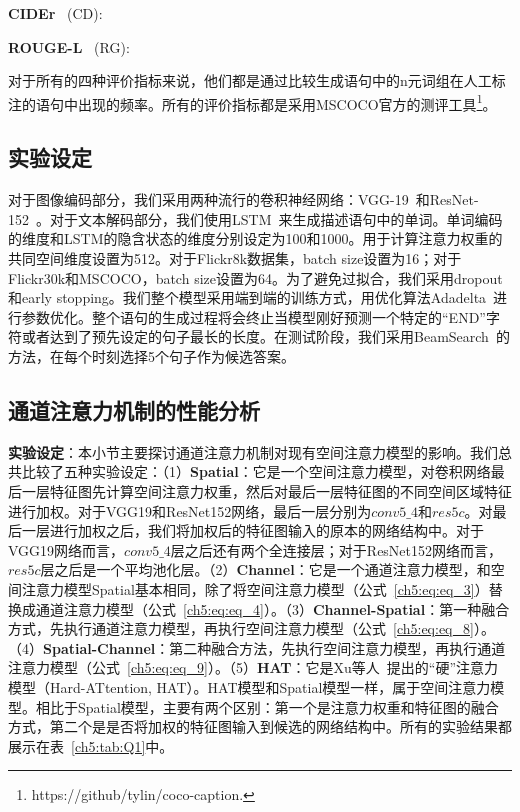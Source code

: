 \noindent\textbf{CIDEr}~\cite{vedantam2015cider} (CD):

\noindent\textbf{ROUGE-L}~\cite{lin2002manual} (RG):


对于所有的四种评价指标来说，他们都是通过比较生成语句中的n元词组在人工标注的语句中出现的频率。所有的评价指标都是采用MSCOCO官方的测评工具\footnote{https://github/tylin/coco-caption.}。



\subsection{实验设定}
对于图像编码部分，我们采用两种流行的卷积神经网络：VGG-19~\cite{simonyan2015very}和ResNet-152~\cite{he2016deep}。对于文本解码部分，我们使用LSTM~\cite{hochreiter1997long}来生成描述语句中的单词。单词编码的维度和LSTM的隐含状态的维度分别设定为100和1000。用于计算注意力权重的共同空间维度设置为512。对于Flickr8k数据集，batch size设置为16；对于Flickr30k和MSCOCO，batch size设置为64。为了避免过拟合，我们采用dropout和early stopping。我们整个模型采用端到端的训练方式，用优化算法Adadelta~\cite{zeiler2012adadelta}进行参数优化。整个语句的生成过程将会终止当模型刚好预测一个特定的“END”字符或者达到了预先设定的句子最长的长度。在测试阶段，我们采用BeamSearch~\cite{vinyals2015show}的方法，在每个时刻选择5个句子作为候选答案。


\subsection{通道注意力机制的性能分析}

\textbf{实验设定}：本小节主要探讨通道注意力机制对现有空间注意力模型的影响。我们总共比较了五种实验设定：（1）\textbf{Spatial}：它是一个空间注意力模型，对卷积网络最后一层特征图先计算空间注意力权重，然后对最后一层特征图的不同空间区域特征进行加权。对于VGG19和ResNet152网络，最后一层分别为$conv5\_4$和$res5c$。对最后一层进行加权之后，我们将加权后的特征图输入的原本的网络结构中。对于VGG19网络而言，$conv5\_4$层之后还有两个全连接层；对于ResNet152网络而言，$res5c$层之后是一个平均池化层。（2）\textbf{Channel}：它是一个通道注意力模型，和空间注意力模型Spatial基本相同，除了将空间注意力模型（公式~\eqref{ch5:eq:eq_3}）替换成通道注意力模型（公式~\eqref{ch5:eq:eq_4}）。（3）\textbf{Channel-Spatial}：第一种融合方式，先执行通道注意力模型，再执行空间注意力模型（公式~\eqref{ch5:eq:eq_8}）。（4）\textbf{Spatial-Channel}：第二种融合方法，先执行空间注意力模型，再执行通道注意力模型（公式~\eqref{ch5:eq:eq_9}）。（5）\textbf{HAT}：它是Xu等人~\cite{xu2015show}提出的“硬”注意力模型（Hard-ATtention, HAT）。HAT模型和Spatial模型一样，属于空间注意力模型。相比于Spatial模型，主要有两个区别：第一个是注意力权重和特征图的融合方式，第二个是是否将加权的特征图输入到候选的网络结构中。所有的实验结果都展示在表~\ref{ch5:tab:Q1}中。


